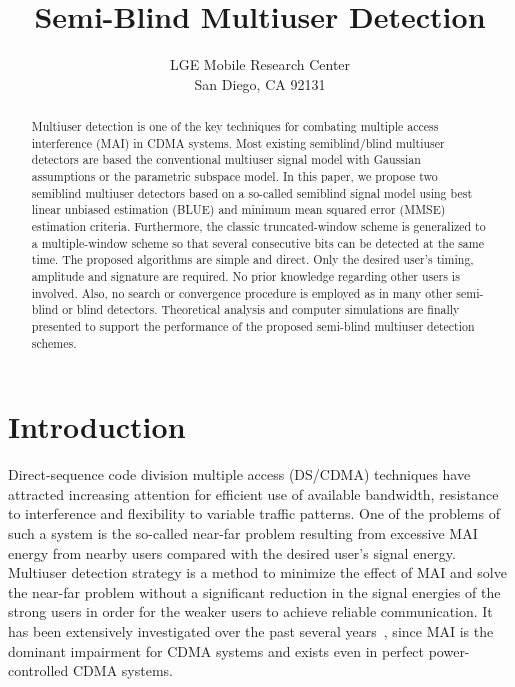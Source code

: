 \documentclass[a4paper,10pt,fleqn, twocolumn]{IEEETran}
\title{ Semi-Blind Multiuser Detection }
\date{}
\author{LGE Mobile Research Center\\San Diego, CA 92131}
\begin{document}
\maketitle

\begin{abstract} Multiuser detection is one of the key techniques for combating
multiple access interference (MAI) in CDMA systems. Most existing
semiblind/blind multiuser detectors are based the conventional
multiuser signal model with Gaussian assumptions or the parametric
subspace model. In this paper, we propose two semiblind multiuser
detectors based on a so-called semiblind signal model using best
linear unbiased estimation (BLUE) and minimum mean squared error
(MMSE) estimation criteria. Furthermore, the classic
truncated-window scheme is generalized to a multiple-window scheme
so that several consecutive bits can be detected at the same time.
The proposed algorithms are simple and direct. Only the desired
user's timing, amplitude and signature are required. No prior
knowledge regarding other users is involved. Also, no search or
convergence procedure is employed as in many other semi-blind or
blind detectors. Theoretical analysis and computer simulations are
finally presented to support the performance of the proposed
semi-blind multiuser detection schemes.
\end{abstract}

\section{Introduction}
Direct-sequence code division multiple access (DS/CDMA) techniques
have attracted increasing attention for efficient use of available
bandwidth, resistance to interference and flexibility to variable
traffic patterns. One of the problems of such a system is the
so-called near-far problem resulting from excessive MAI energy
from nearby users compared with the desired user's signal energy.
Multiuser detection strategy is a method to minimize the effect of
MAI and solve the near-far problem without a significant reduction
in the signal energies of the strong users in order for the weaker
users to achieve reliable communication. It has been extensively
investigated over the past several years~\cite{Verd98}, since MAI
is the dominant impairment for CDMA systems and exists even in
perfect power-controlled CDMA systems.
\end{document}
